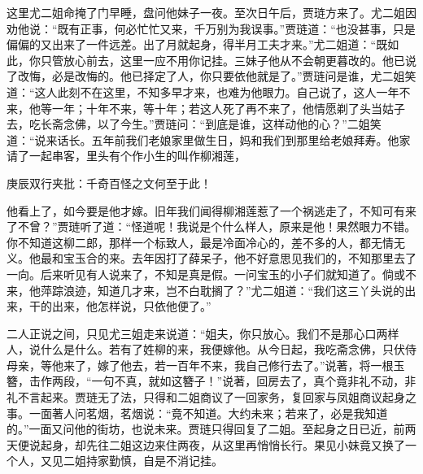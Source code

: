 \begin{parag}
    这里尤二姐命掩了门早睡，盘问他妹子一夜。至次日午后，贾琏方来了。尤二姐因劝他说：“既有正事，何必忙忙又来，千万别为我误事。”贾琏道：“也没甚事，只是偏偏的又出来了一件远差。出了月就起身，得半月工夫才来。”尤二姐道：“既如此，你只管放心前去，这里一应不用你记挂。三妹子他从不会朝更暮改的。他已说了改悔，必是改悔的。他已择定了人，你只要依他就是了。”贾琏问是谁，尤二姐笑道：“这人此刻不在这里，不知多早才来，也难为他眼力。自己说了，这人一年不来，他等一年；十年不来，等十年；若这人死了再不来了，他情愿剃了头当姑子去，吃长斋念佛，以了今生。”贾琏问：“到底是谁，这样动他的心？”二姐笑道：“说来话长。五年前我们老娘家里做生日，妈和我们到那里给老娘拜寿。他家请了一起串客，里头有个作小生的叫作柳湘莲，\begin{note}庚辰双行夹批：千奇百怪之文何至于此！\end{note}他看上了，如今要是他才嫁。旧年我们闻得柳湘莲惹了一个祸逃走了，不知可有来了不曾？”贾琏听了道：“怪道呢！我说是个什么样人，原来是他！果然眼力不错。你不知道这柳二郎，那样一个标致人，最是冷面冷心的，差不多的人，都无情无义。他最和宝玉合的来。去年因打了薛呆子，他不好意思见我们的，不知那里去了一向。后来听见有人说来了，不知是真是假。一问宝玉的小子们就知道了。倘或不来，他萍踪浪迹，知道几才来，岂不白耽搁了？”尤二姐道：“我们这三丫头说的出来，干的出来，他怎样说，只依他便了。”
\end{parag}


\begin{parag}
    二人正说之间，只见尤三姐走来说道：“姐夫，你只放心。我们不是那心口两样人，说什么是什么。若有了姓柳的来，我便嫁他。从今日起，我吃斋念佛，只伏侍母亲，等他来了，嫁了他去，若一百年不来，我自己修行去了。”说著，将一根玉簪，击作两段，“一句不真，就如这簪子！”说著，回房去了，真个竟非礼不动，非礼不言起来。贾琏无了法，只得和二姐商议了一回家务，复回家与凤姐商议起身之事。一面著人问茗烟，茗烟说：“竟不知道。大约未来；若来了，必是我知道的。”一面又问他的街坊，也说未来。贾琏只得回复了二姐。至起身之日已近，前两天便说起身，却先往二姐这边来住两夜，从这里再悄悄长行。果见小妹竟又换了一个人，又见二姐持家勤慎，自是不消记挂。
\end{parag}


